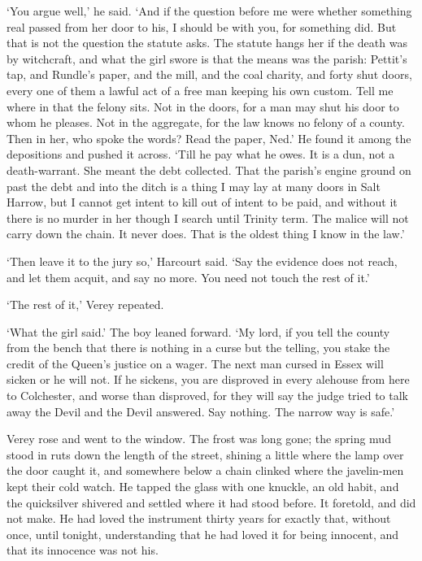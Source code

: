 \documentclass[11pt]{article}
\begin{document}
`You argue well,' he said. `And if the question before me were whether something real passed from her door to his, I should be with you, for something did. But that is not the question the statute asks. The statute hangs her if the death was by witchcraft, and what the girl swore is that the means was the parish: Pettit's tap, and Rundle's paper, and the mill, and the coal charity, and forty shut doors, every one of them a lawful act of a free man keeping his own custom. Tell me where in that the felony sits. Not in the doors, for a man may shut his door to whom he pleases. Not in the aggregate, for the law knows no felony of a county. Then in her, who spoke the words? Read the paper, Ned.' He found it among the depositions and pushed it across. `Till he pay what he owes. It is a dun, not a death-warrant. She meant the debt collected. That the parish's engine ground on past the debt and into the ditch is a thing I may lay at many doors in Salt Harrow, but I cannot get intent to kill out of intent to be paid, and without it there is no murder in her though I search until Trinity term. The malice will not carry down the chain. It never does. That is the oldest thing I know in the law.'

`Then leave it to the jury so,' Harcourt said. `Say the evidence does not reach, and let them acquit, and say no more. You need not touch the rest of it.'

`The rest of it,' Verey repeated.

`What the girl said.' The boy leaned forward. `My lord, if you tell the county from the bench that there is nothing in a curse but the telling, you stake the credit of the Queen's justice on a wager. The next man cursed in Essex will sicken or he will not. If he sickens, you are disproved in every alehouse from here to Colchester, and worse than disproved, for they will say the judge tried to talk away the Devil and the Devil answered. Say nothing. The narrow way is safe.'

Verey rose and went to the window. The frost was long gone; the spring mud stood in ruts down the length of the street, shining a little where the lamp over the door caught it, and somewhere below a chain clinked where the javelin-men kept their cold watch. He tapped the glass with one knuckle, an old habit, and the quicksilver shivered and settled where it had stood before. It foretold, and did not make. He had loved the instrument thirty years for exactly that, without once, until tonight, understanding that he had loved it for being innocent, and that its innocence was not his.
\end{document}
